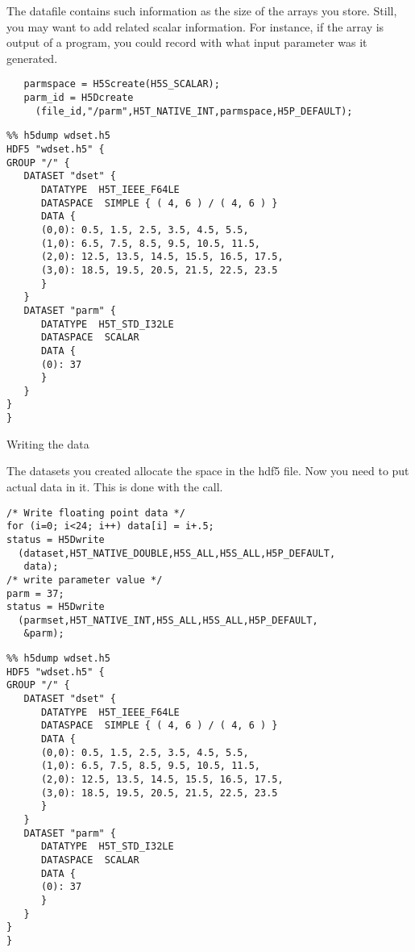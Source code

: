 The datafile contains such information as the size of the arrays you
store. Still, you may want to add related scalar information. For
instance, if the array is output of a program, you could record
with what input
parameter was it generated.

\begin{verbatim}
   parmspace = H5Screate(H5S_SCALAR);
   parm_id = H5Dcreate
     (file_id,"/parm",H5T_NATIVE_INT,parmspace,H5P_DEFAULT);
\end{verbatim}


{\small  }

\begin{verbatim}
%% h5dump wdset.h5 
HDF5 "wdset.h5" {
GROUP "/" {
   DATASET "dset" {
      DATATYPE  H5T_IEEE_F64LE
      DATASPACE  SIMPLE { ( 4, 6 ) / ( 4, 6 ) }
      DATA {
      (0,0): 0.5, 1.5, 2.5, 3.5, 4.5, 5.5,
      (1,0): 6.5, 7.5, 8.5, 9.5, 10.5, 11.5,
      (2,0): 12.5, 13.5, 14.5, 15.5, 16.5, 17.5,
      (3,0): 18.5, 19.5, 20.5, 21.5, 22.5, 23.5
      }
   }
   DATASET "parm" {
      DATATYPE  H5T_STD_I32LE
      DATASPACE  SCALAR
      DATA {
      (0): 37
      }
   }
}
}
\end{verbatim}

 {Writing the data}

The datasets you created allocate the space in the hdf5 file. Now you
need to put actual data in it. This is done with the  call.

{\small
\begin{verbatim}
/* Write floating point data */
for (i=0; i<24; i++) data[i] = i+.5;
status = H5Dwrite
  (dataset,H5T_NATIVE_DOUBLE,H5S_ALL,H5S_ALL,H5P_DEFAULT,
   data); 
/* write parameter value */
parm = 37;
status = H5Dwrite
  (parmset,H5T_NATIVE_INT,H5S_ALL,H5S_ALL,H5P_DEFAULT,
   &parm);
\end{verbatim}



\begin{verbatim}
%% h5dump wdset.h5     
HDF5 "wdset.h5" {
GROUP "/" {
   DATASET "dset" {
      DATATYPE  H5T_IEEE_F64LE
      DATASPACE  SIMPLE { ( 4, 6 ) / ( 4, 6 ) }
      DATA {
      (0,0): 0.5, 1.5, 2.5, 3.5, 4.5, 5.5,
      (1,0): 6.5, 7.5, 8.5, 9.5, 10.5, 11.5,
      (2,0): 12.5, 13.5, 14.5, 15.5, 16.5, 17.5,
      (3,0): 18.5, 19.5, 20.5, 21.5, 22.5, 23.5
      }
   }
   DATASET "parm" {
      DATATYPE  H5T_STD_I32LE
      DATASPACE  SCALAR
      DATA {
      (0): 37
      }
   }
}
}
\end{verbatim}
}

